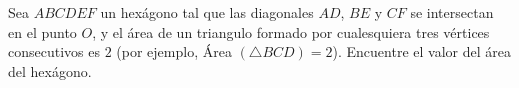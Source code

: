 Sea $ABCDEF$ un hexágono tal que las diagonales $AD$, $BE$ y $CF$ se intersectan en el punto $O$, y el área de un triangulo formado por cualesquiera tres vértices consecutivos es $2$ (por ejemplo, Área $(\triangle BCD) = 2$). Encuentre el valor del área del hexágono.

